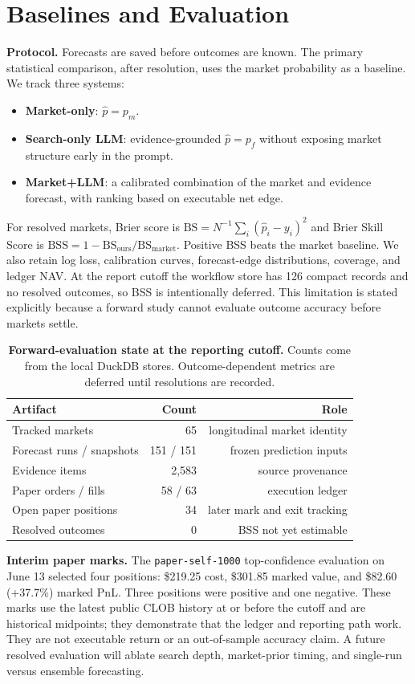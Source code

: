 \section{Baselines and Evaluation}

\textbf{Protocol.} Forecasts are saved before outcomes are known. The primary statistical comparison, after resolution, uses the market probability as a baseline. We track three systems:
\begin{itemize}[leftmargin=*]
  \item \textbf{Market-only}: $\hat p=p_m$.
  \item \textbf{Search-only LLM}: evidence-grounded $\hat p=p_f$ without exposing market structure early in the prompt.
  \item \textbf{Market+LLM}: a calibrated combination of the market and evidence forecast, with ranking based on executable net edge.
\end{itemize}

For resolved markets, Brier score is $\mathrm{BS}=N^{-1}\sum_i(\hat p_i-y_i)^2$ and Brier Skill Score is $\mathrm{BSS}=1-\mathrm{BS}_{\mathrm{ours}}/\mathrm{BS}_{\mathrm{market}}$. Positive BSS beats the market baseline. We also retain log loss, calibration curves, forecast-edge distributions, coverage, and ledger NAV. At the report cutoff the workflow store has 126 compact records and no resolved outcomes, so BSS is intentionally deferred. This limitation is stated explicitly because a forward study cannot evaluate outcome accuracy before markets settle.

\begin{table}[t]
\centering\small
\caption{\textbf{Forward-evaluation state at the reporting cutoff.} Counts come from the local DuckDB stores. Outcome-dependent metrics are deferred until resolutions are recorded.}
\label{tab:state}
\begin{tabular}{lrr}
\toprule
Artifact & Count & Role \\
\midrule
Tracked markets & 65 & longitudinal market identity \\
Forecast runs / snapshots & 151 / 151 & frozen prediction inputs \\
Evidence items & 2,583 & source provenance \\
Paper orders / fills & 58 / 63 & execution ledger \\
Open paper positions & 34 & later mark and exit tracking \\
Resolved outcomes & 0 & BSS not yet estimable \\
\bottomrule
\end{tabular}
\end{table}

\textbf{Interim paper marks.} The \texttt{paper-self-1000} top-confidence evaluation on June 13 selected four positions: \$219.25 cost, \$301.85 marked value, and \$82.60 (+37.7\%) marked PnL. Three positions were positive and one negative. These marks use the latest public CLOB history at or before the cutoff and are historical midpoints; they demonstrate that the ledger and reporting path work. They are not executable return or an out-of-sample accuracy claim. A future resolved evaluation will ablate search depth, market-prior timing, and single-run versus ensemble forecasting.
